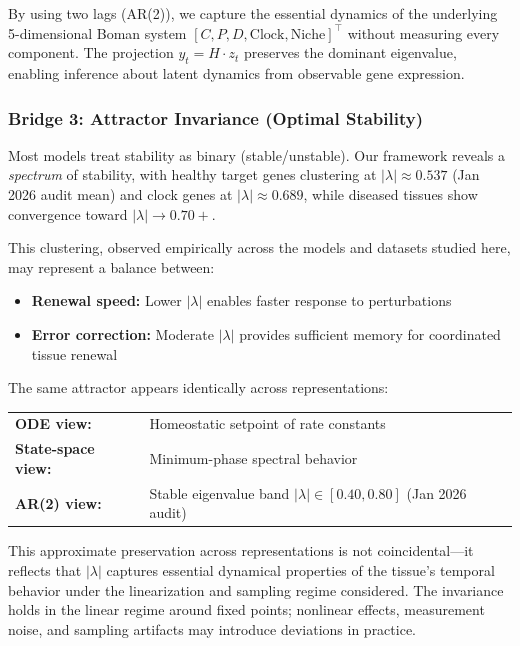 \documentclass[11pt,a4paper]{article}
\begin{document}
By using two lags (AR(2)), we capture the essential dynamics of the underlying 5-dimensional Boman system $[C, P, D, \text{Clock}, \text{Niche}]^\top$ without measuring every component. The projection $y_t = H \cdot z_t$ preserves the dominant eigenvalue, enabling inference about latent dynamics from observable gene expression.

\subsubsection{Bridge 3: Attractor Invariance (Optimal Stability)}

Most models treat stability as binary (stable/unstable). Our framework reveals a \textit{spectrum} of stability, with healthy target genes clustering at $|\lambda| \approx 0.537$ (Jan 2026 audit mean) and clock genes at $|\lambda| \approx 0.689$, while diseased tissues show convergence toward $|\lambda| \to 0.70+$.

This clustering, observed empirically across the models and datasets studied here, may represent a balance between:
\begin{itemize}
    \item \textbf{Renewal speed:} Lower $|\lambda|$ enables faster response to perturbations
    \item \textbf{Error correction:} Moderate $|\lambda|$ provides sufficient memory for coordinated tissue renewal
\end{itemize}

The same attractor appears identically across representations:
\begin{center}
\begin{tabular}{ll}
\textbf{ODE view:} & Homeostatic setpoint of rate constants \\
\textbf{State-space view:} & Minimum-phase spectral behavior \\
\textbf{AR(2) view:} & Stable eigenvalue band $|\lambda| \in [0.40, 0.80]$ (Jan 2026 audit)
\end{tabular}
\end{center}

This approximate preservation across representations is not coincidental---it reflects that $|\lambda|$ captures essential dynamical properties of the tissue's temporal behavior under the linearization and sampling regime considered. The invariance holds in the linear regime around fixed points; nonlinear effects, measurement noise, and sampling artifacts may introduce deviations in practice.
\end{document}
